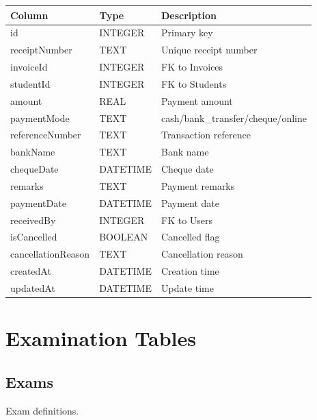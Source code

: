 \documentclass[12pt,a4paper]{report}
\begin{document}
\begin{longtable}{@{}p{4cm}p{2.5cm}p{6.5cm}@{}}
\toprule
\textbf{Column} & \textbf{Type} & \textbf{Description} \\
\midrule
\endhead
id & INTEGER & Primary key \\
receiptNumber & TEXT & Unique receipt number \\
invoiceId & INTEGER & FK to Invoices \\
studentId & INTEGER & FK to Students \\
amount & REAL & Payment amount \\
paymentMode & TEXT & cash/bank\_transfer/cheque/online \\
referenceNumber & TEXT & Transaction reference \\
bankName & TEXT & Bank name \\
chequeDate & DATETIME & Cheque date \\
remarks & TEXT & Payment remarks \\
paymentDate & DATETIME & Payment date \\
receivedBy & INTEGER & FK to Users \\
isCancelled & BOOLEAN & Cancelled flag \\
cancellationReason & TEXT & Cancellation reason \\
createdAt & DATETIME & Creation time \\
updatedAt & DATETIME & Update time \\
\bottomrule
\end{longtable}

\chapter{Examination Tables}

\section{Exams}

Exam definitions.
\end{document}

